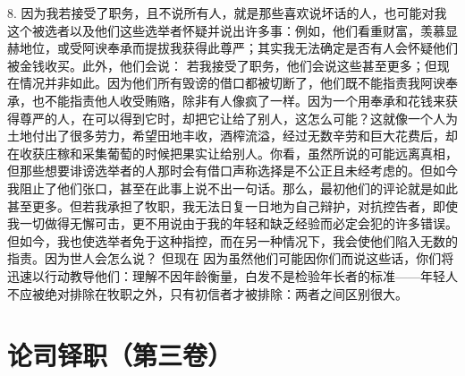 8. 因为我若接受了职务，且不说所有人，就是那些喜欢说坏话的人，也可能对我这个被选者以及他们这些选举者怀疑并说出许多事：例如，他们看重财富，羡慕显赫地位，或受阿谀奉承而提拔我获得此尊严；其实我无法确定是否有人会怀疑他们被金钱收买。此外，他们会说： 若我接受了职务，他们会说这些甚至更多；但现在情况并非如此。因为他们所有毁谤的借口都被切断了，他们既不能指责我阿谀奉承，也不能指责他人收受贿赂，除非有人像疯了一样。因为一个用奉承和花钱来获得尊严的人，在可以得到它时，却把它让给了别人，这怎么可能？这就像一个人为土地付出了很多劳力，希望田地丰收，酒榨流溢，经过无数辛劳和巨大花费后，却在收获庄稼和采集葡萄的时候把果实让给别人。你看，虽然所说的可能远离真相，但那些想要诽谤选举者的人那时会有借口声称选择是不公正且未经考虑的。但如今我阻止了他们张口，甚至在此事上说不出一句话。那么，最初他们的评论就是如此甚至更多。但若我承担了牧职，我无法日复一日地为自己辩护，对抗控告者，即使我一切做得无懈可击，更不用说由于我的年轻和缺乏经验而必定会犯的许多错误。但如今，我也使选举者免于这种指控，而在另一种情况下，我会使他们陷入无数的指责。因为世人会怎么说？ 但现在 因为虽然他们可能因你们而说这些话，你们将迅速以行动教导他们：理解不因年龄衡量，白发不是检验年长者的标准——年轻人不应被绝对排除在牧职之外，只有初信者才被排除：两者之间区别很大。\newline{}\par



\section{论司铎职（第三卷）}

